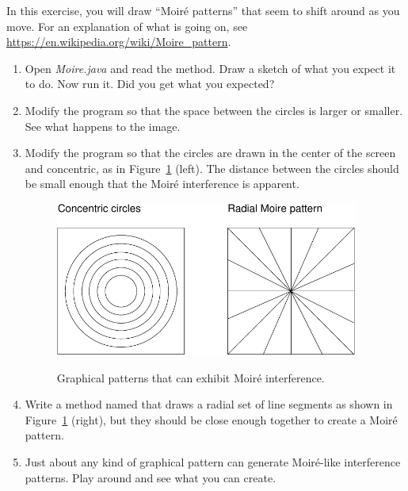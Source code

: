 \begin{exercise}

In this exercise, you will draw ``Moir\'{e} patterns'' that seem to shift around as you move.
For an explanation of what is going on, see \url{https://en.wikipedia.org/wiki/Moire_pattern}.

\begin{enumerate}

\item Open {\it Moire.java} and read the  method.
Draw a sketch of what you expect it to do.
Now run it.
Did you get what you expected?

\item Modify the program so that the space between the circles is larger or smaller.
See what happens to the image.

\item Modify the program so that the circles are drawn in the center of the screen and concentric, as in Figure~\ref{fig.moire} (left).
The distance between the circles should be small enough that the Moir\'{e} interference is apparent.

\begin{figure}[!ht]
\begin{center}
\includegraphics[height=2in,alt={Two graphical patterns: left shows concentric circles that can create Moiré interference, right shows radial line segments arranged to demonstrate interference patterns}]{figs/moire.pdf}
\caption{Graphical patterns that can exhibit Moir\'{e} interference.}
\label{fig.moire}
\end{center}
\end{figure}

\item Write a method named  that draws a radial set of line segments as shown in Figure~\ref{fig.moire} (right), but they should be close enough together to create a Moir\'{e} pattern.

\item Just about any kind of graphical pattern can generate Moir\'{e}-like interference patterns.
Play around and see what you can create.

\end{enumerate}

\end{exercise}
